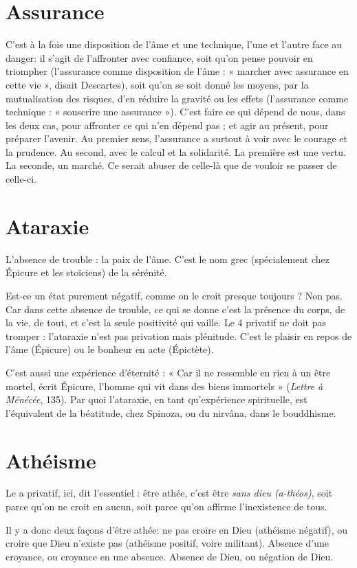 \section{Assurance}
C'est à la fois une disposition de l’âme et une technique, l’une
et l’autre face au danger: il s’agit de l’affronter avec
confiance, soit qu’on pense pouvoir en triompher (l’assurance comme disposition
de l’âme : « marcher avec assurance en cette vie », disait Descartes), soit
qu’on se soit donné les moyens, par la mutualisation des risques, d’en réduire
la gravité ou les effets (l’assurance comme technique : « souscrire une assurance »).
C’est faire ce qui dépend de nous, dans les deux cas, pour affronter ce
qui n’en dépend pas ; et agir au présent, pour préparer l'avenir.
Au premier sens, l’assurance a surtout à voir avec le courage et la prudence.
Au second, avec le calcul et la solidarité. La première est une vertu. La seconde,
un marché. Ce serait abuser de celle-là que de vouloir se passer de celle-ci.

\section{Ataraxie}
L’absence de trouble : la paix de l’âme. C’est le nom grec (spécialement
chez Épicure et les stoïciens) de la sérénité.

Est-ce un état purement négatif, comme on le croit presque toujours ? Non
pas. Car dans cette absence de trouble, ce qui se donne c’est la présence du
corps, de la vie, de tout, et c’est la seule positivité qui vaille. Le 4 privatif ne doit
pas tromper : l’ataraxie n’est pas privation mais plénitude. C’est le plaisir en
repos de l’âme (Épicure) ou le bonheur en acte (Épictète).

C’est aussi une expérience d’éternité : « Car il ne ressemble en rien à un être
mortel, écrit Épicure, l'homme qui vit dans des biens immortels » ({\it Lettre à
Ménécée}, 135). Par quoi l’ataraxie, en tant qu’expérience spirituelle, est l’équivalent
de la béatitude, chez Spinoza, ou du nirvâna, dans le bouddhisme.

\section{Athéisme}
Le a privatif, ici, dit l’essentiel : être athée, c’est être {\it sans dieu}
{\it (a-théos)}, soit parce qu’on ne croit en aucun, soit parce qu’on
affirme l’inexistence de tous.

Il y a donc deux façons d’être athée: ne pas croire en Dieu (athéisme
négatif), ou croire que Dieu n’existe pas (athéisme positif, voire militant).
Absence d’une croyance, ou croyance en une absence. Absence de Dieu, ou
négation de Dieu.


